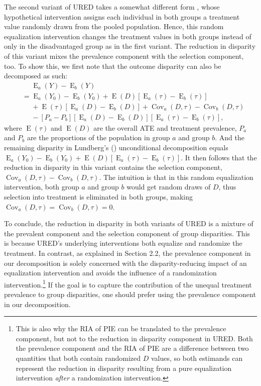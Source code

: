 \documentclass[12pt,a4paper]{article}
\newcommand{\Cov}{\operatorname{Cov}}
\newcommand{\E}{\operatorname{E}}
\begin{document}
The second variant of URED takes a somewhat different form \citep{lundberg_gap-closing_2022}, whose hypothetical intervention assigns each individual in both groups a treatment value randomly drawn from the pooled population. Hence, this random equalization intervention changes the treatment values in both groups instead of only in the disadvantaged group as in the first variant. The reduction in disparity of this variant  mixes the prevalence component with the selection component, too. To show this, we first note that the outcome disparity can also be decomposed as such: 
\begin{align*}
&\phantom{{}={}} \E_a(Y)-\E_b(Y) \\
&= \E_a(Y_{0})-\E_b(Y_{0}) +  \E(D)[ \E_a(\tau) - \E_b(\tau)]  \\
&\phantom{{}={}} +\E(\tau)[\E_a(D)-\E_b(D)] + \Cov_a(D, \tau) - \Cov_b(D, \tau) \\
&\phantom{{}={}} - [P_a-P_b][\E_a(D) - \E_b(D)][\E_a(\tau)-\E_b(\tau)], 
\end{align*} 
where $\E(\tau)$ and $\E(D)$ are the overall ATE and treatment prevalence, $P_a$ and $P_b$ are the proportions of the population in group $a$ and group $b$.
And the remaining disparity in Lundberg's (\citeyear{lundberg_gap-closing_2022}) unconditional decomposition equals 
$\E_a(Y_{0})-\E_b(Y_{0}) + \E(D)[ \E_a(\tau) - \E_b(\tau)] \nonumber$. It then follows that the reduction in disparity in this variant contains the selection component, $\Cov_a(D, \tau) -  \Cov_b(D, \tau)$. The intuition is that in this random equalization intervention, both group $a$ and group $b$ would get random draws of $D$, thus  selection into treatment is eliminated in both groups, making $\Cov_a(D,\tau)=\Cov_b(D,\tau)=0$.

To conclude, the reduction in disparity in both variants of URED is a mixture of the prevalent component and the selection component of group disparities. This is because URED's underlying interventions both equalize and randomize the treatment. In contrast, as explained in Section 2.2,  the prevalence component in our decomposition is solely concerned with the disparity-reducing impact of an equalization intervention and avoids the influence of a randomization intervention.\footnote{This is also why the RIA of PIE can be translated to the prevalence component, but not to the reduction in disparity component in URED. Both the prevalence component and the RIA of PIE are a difference between two quantities that both contain randomized $D$ values, so both estimands can represent the reduction in disparity resulting from a pure equalization intervention \emph{after} a randomization intervention.} If the goal is to capture the contribution of the unequal treatment prevalence to group disparities, one should prefer using the prevalence component in our decomposition.
 
\end{document}
